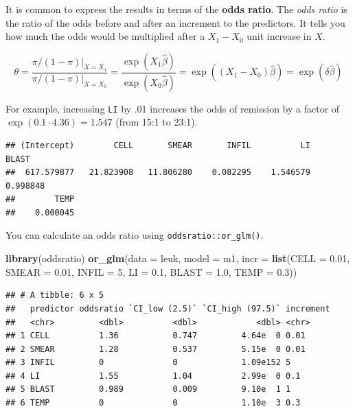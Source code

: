 \documentclass[
]{book}
\newenvironment{Shaded}{\begin{snugshade}}{\end{snugshade}}
\newcommand{\DataTypeTok}[1]{\textcolor[rgb]{0.13,0.29,0.53}{#1}}
\newcommand{\DecValTok}[1]{\textcolor[rgb]{0.00,0.00,0.81}{#1}}
\newcommand{\FloatTok}[1]{\textcolor[rgb]{0.00,0.00,0.81}{#1}}
\newcommand{\KeywordTok}[1]{\textcolor[rgb]{0.13,0.29,0.53}{\textbf{#1}}}
\newcommand{\NormalTok}[1]{#1}
\newcommand{\OperatorTok}[1]{\textcolor[rgb]{0.81,0.36,0.00}{\textbf{#1}}}
\newcommand{\StringTok}[1]{\textcolor[rgb]{0.31,0.60,0.02}{#1}}
\begin{document}
It is common to express the results in terms of the \textbf{odds ratio}. The \emph{odds ratio} is the ratio of the odds before and after an increment to the predictors. It tells you how much the odds would be multiplied after a \(X_1 - X_0\) unit increase in \(X\).

\[\theta = \frac{\pi / (1 - \pi) |_{X = X_1}}{\pi / (1 - \pi) |_{X = X_0}} = \frac{\exp (X_1 \hat{\beta})}{\exp (X_0 \hat{\beta})} = \exp ((X_1-X_0) \hat{\beta}) = \exp (\delta \hat{\beta})\]

For example, increasing \texttt{LI} by .01 increases the odds of remission by a factor of \(\exp(0.1 \cdot 4.36) = 1.547\) (from 15:1 to 23:1).

\begin{Shaded}
\end{Shaded}

\begin{verbatim}
## (Intercept)        CELL       SMEAR       INFIL          LI       BLAST 
##  617.579877   21.823908   11.806280    0.082295    1.546579    0.998848 
##        TEMP 
##    0.000045
\end{verbatim}

You can calculate an odds ratio using \texttt{oddsratio::or\_glm()}.

\begin{Shaded}
\begin{Highlighting}[]
\KeywordTok{library}\NormalTok{(oddsratio)}
\KeywordTok{or_glm}\NormalTok{(}\DataTypeTok{data =}\NormalTok{ leuk, }
       \DataTypeTok{model =}\NormalTok{ m1, }
       \DataTypeTok{incr =} \KeywordTok{list}\NormalTok{(}\DataTypeTok{CELL =} \FloatTok{0.01}\NormalTok{, }
                   \DataTypeTok{SMEAR =} \FloatTok{0.01}\NormalTok{, }
                   \DataTypeTok{INFIL =} \DecValTok{5}\NormalTok{, }
                   \DataTypeTok{LI =} \FloatTok{0.1}\NormalTok{, }
                   \DataTypeTok{BLAST =} \FloatTok{1.0}\NormalTok{, }
                   \DataTypeTok{TEMP =} \FloatTok{0.3}\NormalTok{))}
\end{Highlighting}
\end{Shaded}

\begin{verbatim}
## # A tibble: 6 x 5
##   predictor oddsratio `CI_low (2.5)` `CI_high (97.5)` increment
##   <chr>         <dbl>          <dbl>            <dbl> <chr>    
## 1 CELL          1.36           0.747         4.64e  0 0.01     
## 2 SMEAR         1.28           0.537         5.15e  0 0.01     
## 3 INFIL         0              0             1.09e152 5        
## 4 LI            1.55           1.04          2.99e  0 0.1      
## 5 BLAST         0.989          0.009         9.10e  1 1        
## 6 TEMP          0              0             1.10e  3 0.3
\end{verbatim}
\end{document}

